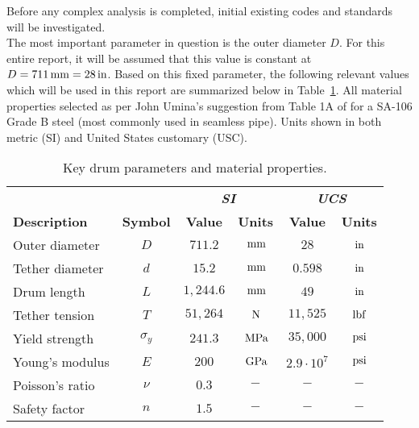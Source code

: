 \label{chapt:standards}

Before any complex analysis is completed, initial existing codes and standards will be investigated.\\

The most important parameter in question is the outer diameter $D$. For this entire report, it will be assumed that this value is constant at $D = 711\,\mathrm{mm} = 28\,\mathrm{in}$. Based on this fixed parameter, the following relevant values which will be used in this report are summarized below in Table~\ref{table:prelim_params}. All material properties selected as per John Umina's  suggestion from Table 1A of \cite{ASMEbvpcIID} for a SA-106 Grade B steel (most commonly used in seamless pipe). Units shown in both metric (SI) and United States customary (USC).\\

\begin{table}[ht]
	\caption{Key drum parameters and material properties.}
	\centering
	\begin{tabular}{lccccc}
		&       & \multicolumn{2}{c}{\textbf{\textit{SI}}} & \multicolumn{2}{c}{\textbf{\textit{UCS}}} \\
		\textbf{Description} & \textbf{Symbol} & \textbf{Value} & \textbf{Units} & \textbf{Value}  & \textbf{Units} \\
		\midrule
		Outer diameter       & $D$           & $711.2$        & $\,\mathrm{mm}$           & $28$            & $\,\mathrm{in}$           \\
		Tether diameter      & $d$       	   & $15.2$         & $\,\mathrm{mm}$           & $0.598$         & $\,\mathrm{in}$           \\
		Drum length          & $L$             & $1,244.6$      & $\,\mathrm{mm}$           & $49$            & $\,\mathrm{in}$           \\
		Tether tension       & $T$             & $51,264$       & $\,\mathrm{N}$            & $11,525$        & $\,\mathrm{lbf}$          \\
		Yield strength       & $\sigma_y$           & $241.3$        & $\,\mathrm{MPa}$          & $35,000$        & $\,\mathrm{psi}$          \\
		Young's modulus      & $E$             & $200$          & $\,\mathrm{GPa}$          & $2.9\cdot 10^7$ & $\,\mathrm{psi}$          \\
		Poisson's ratio      & $\nu$           & $0.3$          & $-$            		& $-$             & $-$           		  \\
		Safety factor        & $n$            & $1.5$          & $-$            		& $-$             & $-$            	      \\
	\end{tabular}%
	\label{table:prelim_params}
\end{table}

